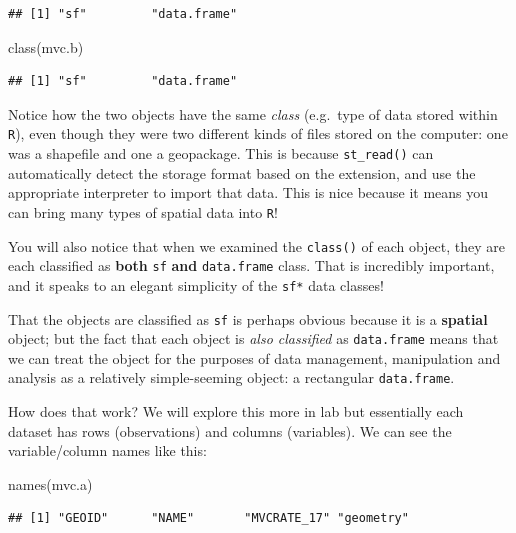 \documentclass[
]{book}
\newenvironment{Shaded}{\begin{snugshade}}{\end{snugshade}}
\newcommand{\FunctionTok}[1]{\textcolor[rgb]{0.00,0.00,0.00}{#1}}
\newcommand{\NormalTok}[1]{#1}
\begin{document}
\begin{verbatim}
## [1] "sf"         "data.frame"
\end{verbatim}

\begin{Shaded}
\begin{Highlighting}[]
\FunctionTok{class}\NormalTok{(mvc.b)}
\end{Highlighting}
\end{Shaded}

\begin{verbatim}
## [1] "sf"         "data.frame"
\end{verbatim}

Notice how the two objects have the same \emph{class} (e.g.~type of data stored within \texttt{R}), even though they were two different kinds of files stored on the computer: one was a shapefile and one a geopackage. This is because \texttt{st\_read()} can automatically detect the storage format based on the extension, and use the appropriate interpreter to import that data. This is nice because it means you can bring many types of spatial data into \texttt{R}!

You will also notice that when we examined the \texttt{class()} of each object, they are each classified as \textbf{both} \texttt{sf} \textbf{and} \texttt{data.frame} class. That is incredibly important, and it speaks to an elegant simplicity of the \texttt{sf*} data classes!

That the objects are classified as \texttt{sf} is perhaps obvious because it is a \textbf{spatial} object; but the fact that each object is \emph{also classified} as \texttt{data.frame} means that we can treat the object for the purposes of data management, manipulation and analysis as a relatively simple-seeming object: a rectangular \texttt{data.frame}.

How does that work? We will explore this more in lab but essentially each dataset has rows (observations) and columns (variables). We can see the variable/column names like this:

\begin{Shaded}
\begin{Highlighting}[]
\FunctionTok{names}\NormalTok{(mvc.a)}
\end{Highlighting}
\end{Shaded}

\begin{verbatim}
## [1] "GEOID"      "NAME"       "MVCRATE_17" "geometry"
\end{verbatim}
\end{document}
